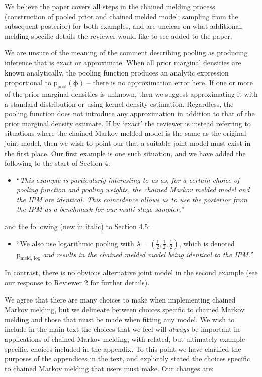 \documentclass[
  10pt,
  a4paper,
]{article}
\providecommand{\tightlist}{%
  \setlength{\itemsep}{0pt}\setlength{\parskip}{0pt}}
\newcommand{\pd}{\text{p}}
\begin{document}
We believe the paper covers all steps in the chained melding process
(construction of pooled prior and chained melded model; sampling from
the subsequent posterior) for both examples, and are unclear on what
additional, melding-specific details the reviewer would like to see
added to the paper.

We are unsure of the meaning of the comment describing pooling as
producing inference that is exact or approximate. When all prior
marginal densities are known analytically, the pooling function produces
an analytic expression proportional to
\(\pd_{\text{pool}}(\boldsymbol{\phi})\) -- there is no approximation
error here. If one or more of the prior marginal densities is unknown,
then we suggest approximating it with a standard distribution or using
kernel density estimation. Regardless, the pooling function does not
introduce any approximation in addition to that of the prior marginal
density estimate. If by `exact' the reviewer is instead referring to
situations where the chained Markov melded model is the same as the
original joint model, then we wish to point our that a suitable joint
model must exist in the first place. Our first example is one such
situation, and we have added the following to the start of Section 4:

\begin{itemize}
\tightlist
\item
  ``\emph{This example is particularly interesting to us as, for a
  certain choice of pooling function and pooling weights, the chained
  Markov melded model and the IPM are identical. This coincidence allows
  us to use the posterior from the IPM as a benchmark for our
  multi-stage sampler.}''
\end{itemize}

and the following (new in italic) to Section 4.5:

\begin{itemize}
\tightlist
\item
  ``We also use logarithmic pooling with
  \(\lambda = (\frac{1}{2}, \frac{1}{2}, \frac{1}{2})\), which is
  denoted \(\pd_{\text{meld, log}}\) \emph{and results in the chained
  melded model being identical to the IPM.}''
\end{itemize}

In contrast, there is no obvious alternative joint model in the second
example (see our response to Reviewer 2 for further details).

We agree that there are many choices to make when implementing chained
Markov melding, but we delineate between choices specific to chained
Markov melding and those that must be made when fitting any model. We
wish to include in the main text the choices that we feel will
\emph{always} be important in applications of chained Markov melding,
with related, but ultimately example-specific, choices included in the
appendix. To this point we have clarified the purposes of the appendices
in the text, and explicitly stated the choices specific to chained
Markov melding that users must make. Our changes are:
\end{document}
